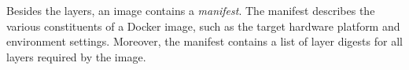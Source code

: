 %
Besides the layers, an image contains a \emph{manifest}.
The manifest describes the various constituents of a Docker image, such as the
target hardware platform and environment settings.
%
Moreover, the manifest contains a list of layer digests for all layers required by the image.
%
%
%

%











